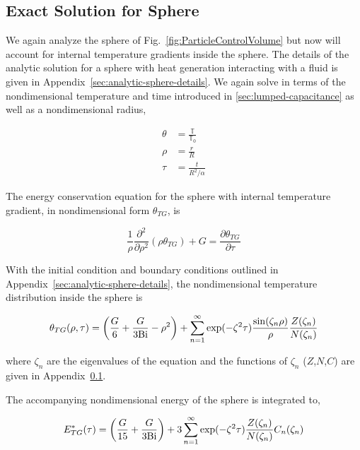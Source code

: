\subsection{Exact Solution for Sphere}\label{sec:analytic-sphere}

We again analyze the sphere of Fig.~\ref{fig:ParticleControlVolume} but now will account for internal temperature gradients inside the sphere. The details of the analytic solution for a sphere with heat generation interacting with a fluid is given in Appendix~\ref{sec:analytic-sphere-details}. We again solve in terms of the nondimensional temperature and time introduced in \cref{sec:lumped-capacitance} as well as a nondimensional radius,

\begin{align*}
    \theta &= \frac{\mathbb{T}}{\mathbb{T}_0}\\
    \rho & = \frac{r}{R}\\
    \tau & = \frac{t}{R^2/\alpha}
\end{align*}

The energy conservation equation for the sphere with internal temperature gradient, in nondimensional form $\theta_{TG}$, is

\begin{equation}
    \frac{1}{\rho}\frac{\partial^2}{\partial \rho^2}(\rho\theta_{TG}) + G = \frac{\partial\theta_{TG}}{\partial \tau}
\end{equation}

With the initial condition and boundary conditions outlined in Appendix~\ref{sec:analytic-sphere-details}, the nondimensional temperature distribution inside the sphere is 

\begin{equation}\label{eq:analytic-temperature-distribution}
    \theta_{TG}(\rho,\tau) = \left(\frac{G}{6} + \frac{G}{3\mathrm{Bi}}-\rho^2\right)  +   \sum_{n=1}^\infty \exp(-\zeta^2 \tau) \frac{\sin(\zeta_n \rho)}{\rho} \frac{Z(\zeta_n)}{N(\zeta_n)}  
\end{equation}

where $\zeta_n$ are the eigenvalues of the equation and the functions of $\zeta_n$ ($Z$,$N$,$C$) are given in Appendix~\ref{sec:analytic-sphere}. 

The accompanying nondimensional energy of the sphere is integrated to,

\begin{equation}
\label{eq:analytic-energy-profile}
    E^*_{TG}(\tau)=\left(\frac{G}{15}+\frac{G}{3\mathrm{Bi}}\right)+3\sum_{n=1}^\infty \exp(-\zeta^2 \tau) \frac{Z(\zeta_n)}{N(\zeta_n)} C_n(\zeta_n)
\end{equation}

